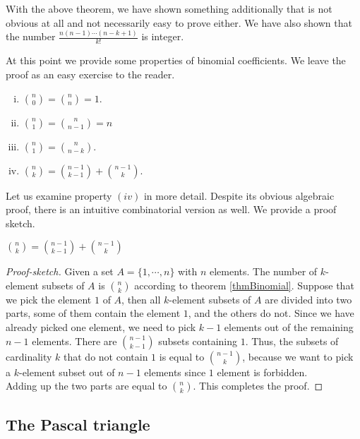 With the above theorem, we have shown something additionally that is not obvious at all and not necessarily easy to prove either.
We have also shown that the number $\frac{n(n-1)\cdots (n-k+1)}{k!}$ is integer.

At this point we provide some properties of binomial coefficients. We leave the proof as an easy exercise to the reader.

\begin{enumerate}[(i)]
    \item $\displaystyle {n \choose 0}={n \choose n}=1$.
    \item $\displaystyle {n \choose 1}={n \choose n-1}=n$
    \item $\displaystyle {n \choose 1}={n \choose n-k}$.
    \item $\displaystyle {n \choose k}={n - 1 \choose k -1} + {n - 1 \choose k}$.
\end{enumerate}

Let us examine property $(iv)$ in more detail. Despite its obvious algebraic proof, there is an intuitive combinatorial version as well.
We provide a proof sketch.

\begin{theorem}
$\displaystyle {n \choose k}={n - 1 \choose k -1} + {n - 1 \choose k}$
\label{recurrencePascal}
\end{theorem}

\begin{proof}[Proof-sketch]
Given a set $A=\{1, \cdots, n\}$ with $n$ elements. The number of $k$-element subsets of $A$ is ${n \choose k}$ according to theorem \ref{thmBinomial}.
Suppose that we pick the element $1$ of $A$, then all $k$-element subsets of $A$ are divided into two parts, some of them contain the element $1$, and the others do not.
Since we have already picked one element, we need to pick $k-1$ elements out of the remaining $n-1$ elements. There are ${n-1 \choose k-1}$ subsets containing $1$.
Thus, the subsets of cardinality $k$ that do not contain $1$ is equal to ${n - 1 \choose k}$, because we want to pick a $k$-element subset out of $n-1$ elements since $1$ element is forbidden.
\\
Adding up the two parts are equal to ${n \choose k}$. This completes the proof.
\end{proof}


\subsection{The Pascal triangle}

